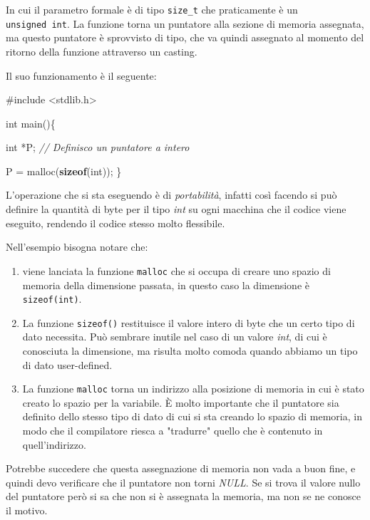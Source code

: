 \documentclass[
]{article}
\newenvironment{Shaded}{}{}
\newcommand{\CommentTok}[1]{\textcolor[rgb]{0.38,0.63,0.69}{\textit{#1}}}
\newcommand{\DataTypeTok}[1]{\textcolor[rgb]{0.56,0.13,0.00}{#1}}
\newcommand{\ImportTok}[1]{#1}
\newcommand{\KeywordTok}[1]{\textcolor[rgb]{0.00,0.44,0.13}{\textbf{#1}}}
\newcommand{\NormalTok}[1]{#1}
\newcommand{\PreprocessorTok}[1]{\textcolor[rgb]{0.74,0.48,0.00}{#1}}
\begin{document}
In cui il parametro formale è di tipo \texttt{size\_t} che praticamente
è un \texttt{unsigned\ int}. La funzione torna un puntatore alla sezione
di memoria assegnata, ma questo puntatore è sprovvisto di tipo, che va
quindi assegnato al momento del ritorno della funzione attraverso un
casting.

Il suo funzionamento è il seguente:

\begin{Shaded}
\begin{Highlighting}[]
\PreprocessorTok{\#include }\ImportTok{\textless{}stdlib.h\textgreater{}}

\DataTypeTok{int}\NormalTok{ main()\{}
    
	\DataTypeTok{int}\NormalTok{ *P; }\CommentTok{// Definisco un puntatore a intero}
	
\NormalTok{    P = malloc(}\KeywordTok{sizeof}\NormalTok{(}\DataTypeTok{int}\NormalTok{));}
\NormalTok{\}}
\end{Highlighting}
\end{Shaded}

L'operazione che si sta eseguendo è di \emph{portabilità}, infatti così
facendo si può definire la quantità di byte per il tipo \emph{int} su
ogni macchina che il codice viene eseguito, rendendo il codice stesso
molto flessibile.

Nell'esempio bisogna notare che:

\begin{enumerate}
\def\labelenumi{\arabic{enumi}.}
\item
  viene lanciata la funzione \texttt{malloc} che si occupa di creare uno
  spazio di memoria della dimensione passata, in questo caso la
  dimensione è \texttt{sizeof(int)}.
\item
  La funzione \texttt{sizeof()} restituisce il valore intero di byte che
  un certo tipo di dato necessita. Può sembrare inutile nel caso di un
  valore \emph{int}, di cui è conosciuta la dimensione, ma risulta molto
  comoda quando abbiamo un tipo di dato user-defined.
\item
  La funzione \texttt{malloc} torna un indirizzo alla posizione di
  memoria in cui è stato creato lo spazio per la variabile. È molto
  importante che il puntatore sia definito dello stesso tipo di dato di
  cui si sta creando lo spazio di memoria, in modo che il compilatore
  riesca a "tradurre" quello che è contenuto in quell'indirizzo.
\end{enumerate}

Potrebbe succedere che questa assegnazione di memoria non vada a buon
fine, e quindi devo verificare che il puntatore non torni \emph{NULL}.
Se si trova il valore nullo del puntatore però si sa che non si è
assegnata la memoria, ma non se ne conosce il motivo.
\end{document}
